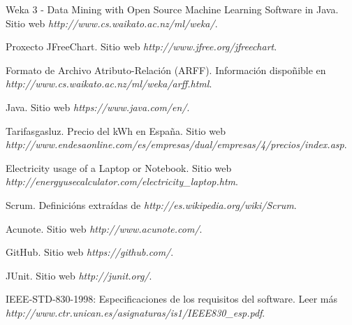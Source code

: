 

\begin{thebibliography}{99}

 Weka 3 - Data Mining with Open Source Machine Learning Software in Java. Sitio web {\it http://www.cs.waikato.ac.nz/ml/weka/}.

 Proxecto JFreeChart. Sitio web {\it http://www.jfree.org/jfreechart}.

 Formato de Archivo Atributo-Relación (ARFF). Información dispoñible en {\it http://www.cs.waikato.ac.nz/ml/weka/arff.html}.

 Java. Sitio web {\it https://www.java.com/en/}.

 Tarifasgasluz. Precio del kWh en España. Sitio web {\it http://www.endesaonline.com/es/empresas/dual/empresas/4/precios/index.asp}.

 Electricity usage of a Laptop or Notebook. Sitio web {\it http://energyusecalculator.com/electricity\_laptop.htm}.

 Scrum. Definicións extraídas de {\it http://es.wikipedia.org/wiki/Scrum}.

 Acunote. Sitio web {\it http://www.acunote.com/}.

 GitHub. Sitio web {\it https://github.com/}.

 JUnit. Sitio web {\it http://junit.org/}.

 IEEE-STD-830-1998: Especificaciones de los requisitos del software. Leer más {\it http://www.ctr.unican.es/asignaturas/is1/IEEE830_esp.pdf}.

\end{thebibliography}

